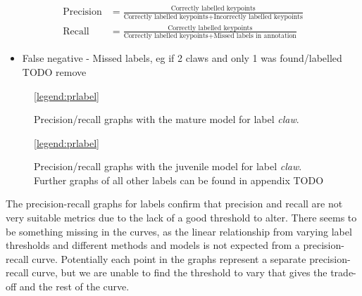 \begin{align}
\text{Precision} &= \frac{\text{Correctly labelled keypoints}}{\text{Correctly labelled keypoints} + \text{Incorrectly labelled keypoints}}
\\[10pt]
\text{Recall} &= \frac{\text{Correctly labelled keypoints}}{\text{Correctly labelled keypoints} + \text{Missed labels in annotation}}
\end{align}

\begin{itemize}
\item False negative - Missed labels, eg if 2 claws and only 1 was found/labelled TODO remove
\end{itemize}



\begin{figure}[H]
\centering
{}
\ref{legend:prlabel}
\caption{Precision/recall graphs with the mature model for label \textit{claw}.}
\end{figure}

\begin{figure}[H]
\centering
{}
\ref{legend:prlabel}
\caption{Precision/recall graphs with the juvenile model for label \textit{claw}. Further graphs of all other labels can be found in appendix TODO}
\end{figure}
\noindent
The precision-recall graphs for labels confirm that precision and recall are not very suitable metrics due to the lack of a good threshold to alter. There seems to be something missing in the curves, as the linear relationship from varying label thresholds and different methods and models is not expected from a precision-recall curve. Potentially each point in the graphs represent a separate precision-recall curve, but we are unable to find the threshold to vary that gives the trade-off and the rest of the curve. 
\n


%
%
%

